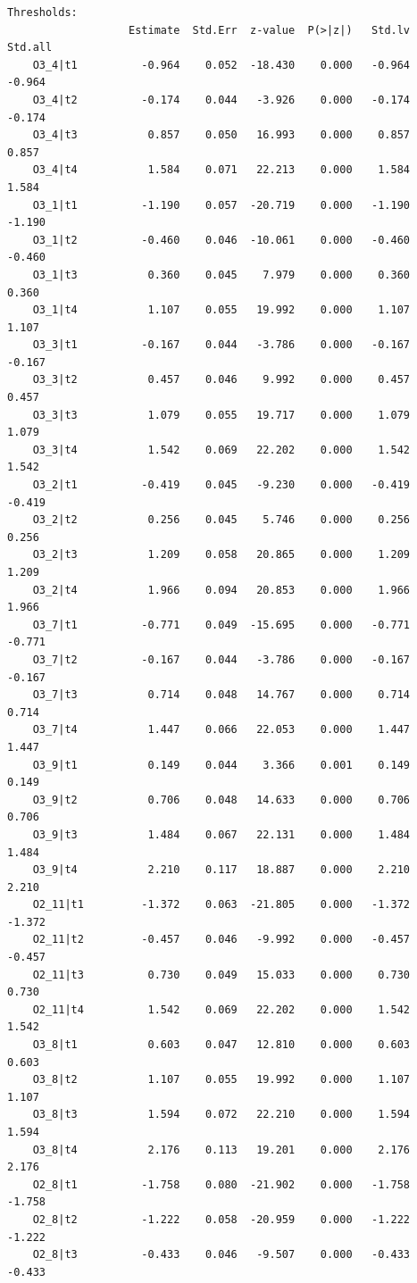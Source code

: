 \documentclass[
  letterpaper,
  DIV=11,
  numbers=noendperiod]{scrartcl}
\begin{document}
\begin{verbatim}
Thresholds:
                   Estimate  Std.Err  z-value  P(>|z|)   Std.lv  Std.all
    O3_4|t1          -0.964    0.052  -18.430    0.000   -0.964   -0.964
    O3_4|t2          -0.174    0.044   -3.926    0.000   -0.174   -0.174
    O3_4|t3           0.857    0.050   16.993    0.000    0.857    0.857
    O3_4|t4           1.584    0.071   22.213    0.000    1.584    1.584
    O3_1|t1          -1.190    0.057  -20.719    0.000   -1.190   -1.190
    O3_1|t2          -0.460    0.046  -10.061    0.000   -0.460   -0.460
    O3_1|t3           0.360    0.045    7.979    0.000    0.360    0.360
    O3_1|t4           1.107    0.055   19.992    0.000    1.107    1.107
    O3_3|t1          -0.167    0.044   -3.786    0.000   -0.167   -0.167
    O3_3|t2           0.457    0.046    9.992    0.000    0.457    0.457
    O3_3|t3           1.079    0.055   19.717    0.000    1.079    1.079
    O3_3|t4           1.542    0.069   22.202    0.000    1.542    1.542
    O3_2|t1          -0.419    0.045   -9.230    0.000   -0.419   -0.419
    O3_2|t2           0.256    0.045    5.746    0.000    0.256    0.256
    O3_2|t3           1.209    0.058   20.865    0.000    1.209    1.209
    O3_2|t4           1.966    0.094   20.853    0.000    1.966    1.966
    O3_7|t1          -0.771    0.049  -15.695    0.000   -0.771   -0.771
    O3_7|t2          -0.167    0.044   -3.786    0.000   -0.167   -0.167
    O3_7|t3           0.714    0.048   14.767    0.000    0.714    0.714
    O3_7|t4           1.447    0.066   22.053    0.000    1.447    1.447
    O3_9|t1           0.149    0.044    3.366    0.001    0.149    0.149
    O3_9|t2           0.706    0.048   14.633    0.000    0.706    0.706
    O3_9|t3           1.484    0.067   22.131    0.000    1.484    1.484
    O3_9|t4           2.210    0.117   18.887    0.000    2.210    2.210
    O2_11|t1         -1.372    0.063  -21.805    0.000   -1.372   -1.372
    O2_11|t2         -0.457    0.046   -9.992    0.000   -0.457   -0.457
    O2_11|t3          0.730    0.049   15.033    0.000    0.730    0.730
    O2_11|t4          1.542    0.069   22.202    0.000    1.542    1.542
    O3_8|t1           0.603    0.047   12.810    0.000    0.603    0.603
    O3_8|t2           1.107    0.055   19.992    0.000    1.107    1.107
    O3_8|t3           1.594    0.072   22.210    0.000    1.594    1.594
    O3_8|t4           2.176    0.113   19.201    0.000    2.176    2.176
    O2_8|t1          -1.758    0.080  -21.902    0.000   -1.758   -1.758
    O2_8|t2          -1.222    0.058  -20.959    0.000   -1.222   -1.222
    O2_8|t3          -0.433    0.046   -9.507    0.000   -0.433   -0.433

\end{verbatim}
\end{document}
